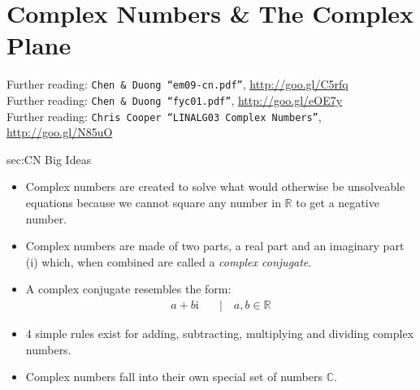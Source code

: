 \chapter{Complex Numbers \& The Complex Plane}
\label{chap:CN}
Further reading: \texttt{Chen \& Duong ``em09-cn.pdf''}, \url{http://goo.gl/C5rfq} \\
Further reading: \texttt{Chen \& Duong ``fyc01.pdf''}, \url{http://goo.gl/eOE7y} \\
Further reading: \texttt{Chris Cooper ``LINALG03 Complex Numbers''}, \url{http://goo.gl/N85uO}

\begin{bigideas}{sec:CN Big Ideas}
\begin{itemize}
  \item Complex numbers are created to solve what would otherwise be unsolveable
  equations because we cannot square any number in $\mathbb{R}$ to get a
  negative number.
  \item Complex numbers are made of two parts, a real part and an imaginary part
  (i) which, when combined are called a \emph{complex conjugate}.
  \item A complex conjugate resembles the form:\\
  \begin{align}
    a + b\text{i} & \quad | \quad a,b \in \mathbb{R} 
  \end{align}
  \item 4 simple rules exist for adding, subtracting, multiplying and dividing
  complex numbers.
  \item Complex numbers fall into their own special set of numbers $\mathbb{C}$.
\end{itemize}
\end{bigideas}

